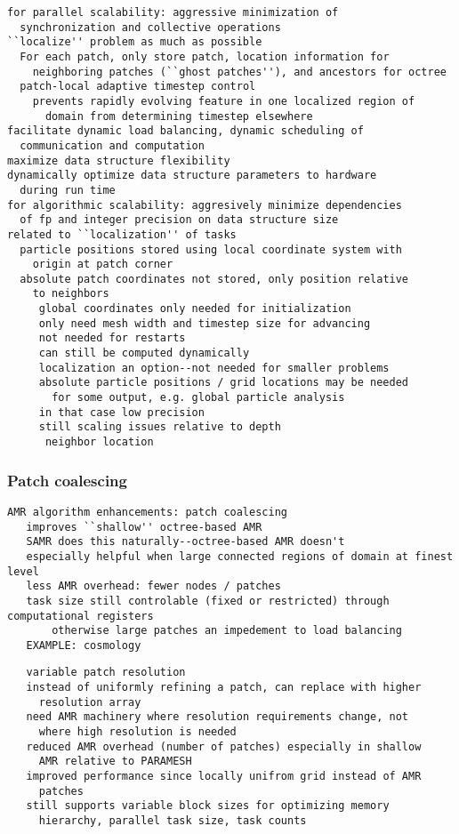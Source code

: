 \documentclass{article}
\begin{document}
\begin{verbatim}
for parallel scalability: aggressive minimization of
  synchronization and collective operations
``localize'' problem as much as possible
  For each patch, only store patch, location information for
    neighboring patches (``ghost patches''), and ancestors for octree
  patch-local adaptive timestep control
    prevents rapidly evolving feature in one localized region of
      domain from determining timestep elsewhere
facilitate dynamic load balancing, dynamic scheduling of
  communication and computation
maximize data structure flexibility
dynamically optimize data structure parameters to hardware
  during run time
for algorithmic scalability: aggresively minimize dependencies
  of fp and integer precision on data structure size
related to ``localization'' of tasks
  particle positions stored using local coordinate system with
    origin at patch corner
  absolute patch coordinates not stored, only position relative
    to neighbors
     global coordinates only needed for initialization
     only need mesh width and timestep size for advancing
     not needed for restarts
     can still be computed dynamically
     localization an option--not needed for smaller problems
     absolute particle positions / grid locations may be needed
       for some output, e.g. global particle analysis
     in that case low precision
     still scaling issues relative to depth
      neighbor location
\end{verbatim}

\subsubsection{Patch coalescing } \label{sss:patch-coalescing}

\begin{verbatim}
AMR algorithm enhancements: patch coalescing
   improves ``shallow'' octree-based AMR
   SAMR does this naturally--octree-based AMR doesn't
   especially helpful when large connected regions of domain at finest level
   less AMR overhead: fewer nodes / patches
   task size still controlable (fixed or restricted) through computational registers
       otherwise large patches an impedement to load balancing
   EXAMPLE: cosmology
\end{verbatim}

\begin{verbatim}
   variable patch resolution
   instead of uniformly refining a patch, can replace with higher
     resolution array
   need AMR machinery where resolution requirements change, not
     where high resolution is needed
   reduced AMR overhead (number of patches) especially in shallow
     AMR relative to PARAMESH
   improved performance since locally unifrom grid instead of AMR
     patches
   still supports variable block sizes for optimizing memory
     hierarchy, parallel task size, task counts
\end{verbatim}
\end{document}
